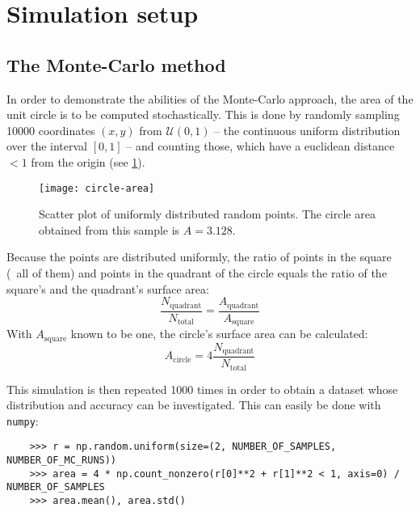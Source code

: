 \section{Simulation setup}
\subsection{The Monte-Carlo method}
In order to demonstrate the abilities of the Monte-Carlo approach, the area
of the unit circle is to be computed stochastically. This is done by
randomly sampling \num{10000} coordinates $(x,y)$ from $\mathcal{U}(0,1)$
-- the continuous uniform distribution over the interval $[0,1]$ -- and
counting those, which have a euclidean distance $<1$ from the origin (see
\cref{fig:circle-area-scatter}).

\begin{figure}[ht]
    \centering
    \texttt{[image: circle-area]}
    \caption{Scatter plot of uniformly distributed random points. The circle
    area obtained from this sample is $A=3.128$.}
    \label{fig:circle-area-scatter}
\end{figure}

Because the points are distributed uniformly, the ratio of points in the
square (\ie~all of them) and points in the quadrant of the circle equals the
ratio of the square's and the quadrant's surface area:
\begin{equation*}
    \frac{N_{\mathrm{quadrant}}}{N_{\mathrm{total}}}
    =\frac{A_{\mathrm{quadrant}}}{A_{\mathrm{square}}}
\end{equation*}
With $A_{\mathrm{square}}$ known to be one, the circle's surface area can
be calculated:
\begin{equation}
    A_{\mathrm{circle}}=4\frac{N_{\mathrm{quadrant}}}{N_{\mathrm{total}}}
    \label{eq:circle-area-mc}
\end{equation}

This simulation is then repeated \num{1000} times in order to
obtain a dataset whose distribution and accuracy can be investigated.
This can easily be done with \texttt{numpy}:
\begin{verbatim}
    >>> r = np.random.uniform(size=(2, NUMBER_OF_SAMPLES, NUMBER_OF_MC_RUNS))
    >>> area = 4 * np.count_nonzero(r[0]**2 + r[1]**2 < 1, axis=0) / NUMBER_OF_SAMPLES
    >>> area.mean(), area.std()
\end{verbatim}


